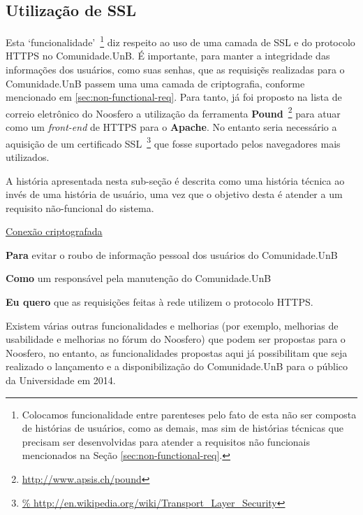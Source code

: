 \subsection{Utilização de SSL}

Esta `funcionalidade'~\footnote{Colocamos funcionalidade entre parenteses pelo
fato de esta não ser composta de histórias de usuários, como as demais, mas sim
de histórias técnicas que precisam ser desenvolvidas para atender a requisitos
não funcionais mencionados na Seção \ref{sec:non-functional-req}.} diz respeito
ao uso de uma camada de SSL e do protocolo HTTPS no Comunidade.UnB.
%
É importante, para manter a integridade das informações
dos usuários, como suas senhas, que as requisiçẽs realizadas para o
Comunidade.UnB passem uma uma camada de criptografia, conforme mencionado em
\ref{sec:non-functional-req}.
%
Para tanto, já foi proposto na lista de correio eletrônico do Noosfero a
utilização da ferramenta \textbf{Pound}~\footnote{\url{http://www.apsis.ch/pound}}
para atuar como um \textit{front-end} de HTTPS para o \textbf{Apache}.
%
No entanto seria necessário a aquisição de um certificado SSL~\footnote{\url{%
http://en.wikipedia.org/wiki/Transport_Layer_Security}} que fosse suportado
pelos navegadores mais utilizados.

A história apresentada nesta sub-seção é descrita como uma história técnica ao
invés de uma história de usuário, uma vez que o objetivo desta é atender a
um requisito não-funcional do sistema.

\item \underline{Conexão criptografada}

	\textbf{Para} evitar o roubo de informação pessoal dos usuários do
Comunidade.UnB

	\textbf{Como} um responsável pela manutenção do Comunidade.UnB

	\textbf{Eu quero} que as requisições feitas à rede utilizem o protocolo
HTTPS.


Existem várias outras funcionalidades e melhorias (por exemplo, melhorias de
usabilidade e melhorias no fórum do Noosfero) que podem ser propostas para
o Noosfero, no entanto, as funcionalidades propostas aqui já possibilitam que
seja realizado o lançamento e a disponibilização do Comunidade.UnB para o
público da Universidade em 2014.
